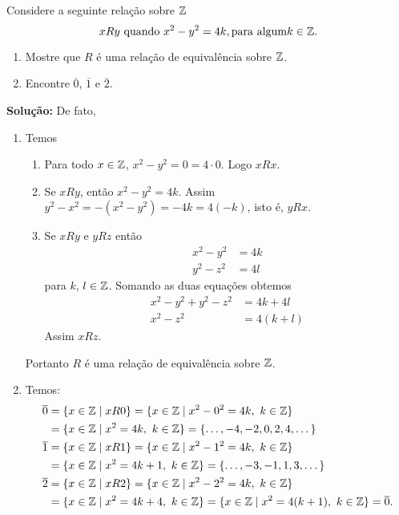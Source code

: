 \documentclass[12pt]{article}
\begin{document}
\vspace{.5cm}

\questao Considere a seguinte relação sobre $\mathbb{Z}$
\[
	xRy \mbox{ quando } x^2 - y^2 = 4k, \mbox{para algum} k \in \mathbb{Z}.
\]

\begin{enumerate}[label={\alph*})]
	\item Mostre que $R$ é uma rela{\c c}{\~a}o de equival{\^e}ncia sobre $\mathbb{Z}$.
	\item Encontre $\overline{0}$, $\overline{1}$ e $\overline{2}$.
\end{enumerate}

\noindent\textbf{Solu\c{c}\~ao:} De fato,
	\begin{enumerate}[label={\alph*})]
		\item Temos
		\begin{enumerate}[label={\roman*})]
			\item Para todo $x \in \mathbb{Z}$, $x^2 - y^2 = 0 = 4\cdot 0$. Logo $xRx$.
			\item Se $xRy$, então $x^2 - y^2 = 4k$. Assim $y^2 - x^2 = -(x^2 - y^2) = -4k = 4(-k)$, isto é, $yRx$.
			\item Se $xRy$ e $yRz$ então
			\begin{align}
				x^2 - y^2 &= 4k\label{primeira_equacao}\\
				y^2 - z^2 &= 4l\label{segunda_equacao}
			\end{align}
			para $k$, $l \in \mathbb{Z}$.
			Somando as duas equações obtemos
			\begin{align}\label{terceira_equacao}
				x^2 - y^2 + y^2 - z^2 &= 4k + 4l\\
				x^2 - z^2 &= 4(k + l)
			\end{align}
			Assim $xRz$.
		\end{enumerate}

		Portanto $R$ é uma relação de equivalência sobre $\mathbb{Z}$.

		\item Temos:
		\begin{align*}
			\overline{0} &= \{x \in \mathbb{Z} \mid xR0\} = \{x \in \mathbb{Z} \mid x^2 - 0^2 = 4k,\ k \in \mathbb{Z}\} \\
			&= \{x \in \mathbb{Z} \mid x^2 = 4k, \ k \in \mathbb{Z}\} = \{\dots, -4,-2,0,2,4, \dots\}\\
			\overline{1} &= \{x \in \mathbb{Z} \mid xR1\} = \{x \in \mathbb{Z} \mid x^2 - 1^2 = 4k,\ k \in \mathbb{Z}\} \\
			&= \{x \in \mathbb{Z} \mid x^2 = 4k + 1, \ k \in \mathbb{Z}\} = \{\dots, -3,-1,1,3, \dots\}\\
			\overline{2} &= \{x \in \mathbb{Z} \mid xR2\} = \{x \in \mathbb{Z} \mid x^2 - 2^2 = 4k,\ k \in \mathbb{Z}\} \\
			&= \{x \in \mathbb{Z} \mid x^2 = 4k + 4, \ k \in \mathbb{Z}\} = \{x \in \mathbb{Z} \mid x^2 = 4(k + 1), \ k \in \mathbb{Z}\} = \overline{0}.
		\end{align*}
	\end{enumerate}
\end{document}
